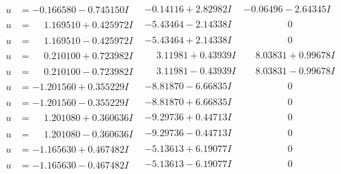 \documentclass[1p]{elsarticle_modified}
\theoremstyle{definition}
\begin{document}
$$\begin{array}{c|c|c}
\begin{aligned}
u &= -0.166580 - 0.745150 I\end{aligned}
 & -0.14116 + 2.82982 I & -0.06496 - 2.64345 I \\ \hline\begin{aligned}
u &= \phantom{-}1.169510 + 0.425972 I\end{aligned}
 & -5.43464 - 2.14338 I & \phantom{-0.000000 } 0 \\ \hline\begin{aligned}
u &= \phantom{-}1.169510 - 0.425972 I\end{aligned}
 & -5.43464 + 2.14338 I & \phantom{-0.000000 } 0 \\ \hline\begin{aligned}
u &= \phantom{-}0.210100 + 0.723982 I\end{aligned}
 & \phantom{-}3.11981 + 0.43939 I & \phantom{-}8.03831 + 0.99678 I \\ \hline\begin{aligned}
u &= \phantom{-}0.210100 - 0.723982 I\end{aligned}
 & \phantom{-}3.11981 - 0.43939 I & \phantom{-}8.03831 - 0.99678 I \\ \hline\begin{aligned}
u &= -1.201560 + 0.355229 I\end{aligned}
 & -8.81870 - 6.66835 I & \phantom{-0.000000 } 0 \\ \hline\begin{aligned}
u &= -1.201560 - 0.355229 I\end{aligned}
 & -8.81870 + 6.66835 I & \phantom{-0.000000 } 0 \\ \hline\begin{aligned}
u &= \phantom{-}1.201080 + 0.360636 I\end{aligned}
 & -9.29736 + 0.44713 I & \phantom{-0.000000 } 0 \\ \hline\begin{aligned}
u &= \phantom{-}1.201080 - 0.360636 I\end{aligned}
 & -9.29736 - 0.44713 I & \phantom{-0.000000 } 0 \\ \hline\begin{aligned}
u &= -1.165630 + 0.467482 I\end{aligned}
 & -5.13613 + 6.19077 I & \phantom{-0.000000 } 0 \\ \hline\begin{aligned}
u &= -1.165630 - 0.467482 I\end{aligned}
 & -5.13613 - 6.19077 I & \phantom{-0.000000 } 0 \\ \hline\begin{aligned}

\end{aligned}
\end{array}$$
\end{document}

